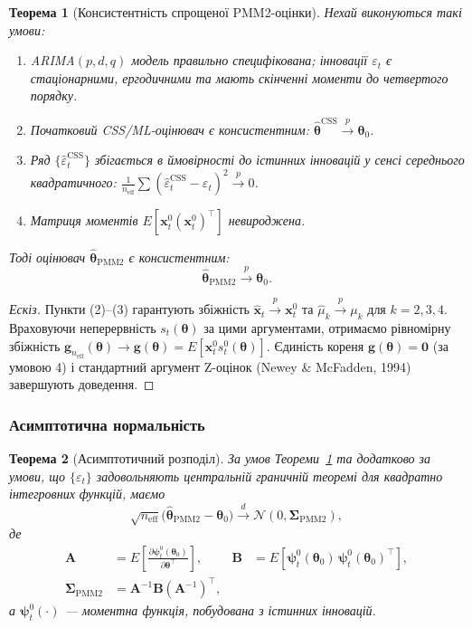 \documentclass[12pt,a4paper]{article}
\newtheorem{theorem}{Теорема}[section]
\begin{document}
\begin{theorem}[Консистентність спрощеної PMM2-оцінки]
\label{thm:pmm2_consistency}
Нехай виконуються такі умови:
\begin{enumerate}
    \item ARIMA$(p,d,q)$ модель правильно специфікована; інновації $\varepsilon_t$ є стаціонарними, ергодичними та мають скінченні моменти до четвертого порядку.
    \item Початковий CSS/ML-оцінювач є консистентним: $\hat{\boldsymbol{\theta}}^{\text{CSS}} \xrightarrow{p} \boldsymbol{\theta}_0$.
    \item Ряд $\{\widehat{\varepsilon}_t^{\text{CSS}}\}$ збігається в ймовірності до істинних інновацій у сенсі середнього квадратичного: $\frac{1}{n_\text{eff}}\sum (\widehat{\varepsilon}_t^{\text{CSS}} - \varepsilon_t)^2 \xrightarrow{p} 0$.
    \item Матриця моментів $E[\mathbf{x}_t^0 (\mathbf{x}_t^0)^\top]$ невироджена.
\end{enumerate}
Тоді оцінювач $\hat{\boldsymbol{\theta}}_{\text{PMM2}}$ є консистентним:
\[
\hat{\boldsymbol{\theta}}_{\text{PMM2}} \xrightarrow{p} \boldsymbol{\theta}_0.
\]
\end{theorem}

\begin{proof}[Ескіз]
Пункти (2)--(3) гарантують збіжність $\widehat{\mathbf{x}}_t \xrightarrow{p} \mathbf{x}_t^0$ та $\hat{\mu}_k \xrightarrow{p} \mu_k$ для $k=2,3,4$. Враховуючи неперервність $s_t(\boldsymbol{\theta})$ за цими аргументами, отримаємо рівномірну збіжність $\mathbf{g}_{n_\text{eff}}(\boldsymbol{\theta}) \to \mathbf{g}(\boldsymbol{\theta}) = E[\mathbf{x}_t^0 s_t^0(\boldsymbol{\theta})]$. Єдиність кореня $\mathbf{g}(\boldsymbol{\theta})=\mathbf{0}$ (за умовою 4) і стандартний аргумент Z-оцінок (Newey \& McFadden, 1994) завершують доведення.
\end{proof}

\subsubsection{Асимптотична нормальність}

\begin{theorem}[Асимптотичний розподіл]
\label{thm:asymptotic_normality}
За умов Теореми~\ref{thm:pmm2_consistency} та додатково за умови, що $\{\varepsilon_t\}$ задовольняють центральній граничній теоремі для квадратно інтегровних функцій, маємо
\[
\sqrt{n_\text{eff}}\big(\hat{\boldsymbol{\theta}}_{\text{PMM2}} - \boldsymbol{\theta}_0\big) \xrightarrow{d} \mathcal{N}(0,\boldsymbol{\Sigma}_{\text{PMM2}}),
\]
де
\begin{align}
\mathbf{A} &= E\!\left[ \frac{\partial \boldsymbol{\psi}_t^0(\boldsymbol{\theta}_0)}{\partial \boldsymbol{\theta}^\top} \right],
&
\mathbf{B} &= E\!\left[ \boldsymbol{\psi}_t^0(\boldsymbol{\theta}_0)\, \boldsymbol{\psi}_t^0(\boldsymbol{\theta}_0)^\top \right],\\
\boldsymbol{\Sigma}_{\text{PMM2}} &= \mathbf{A}^{-1}\mathbf{B}(\mathbf{A}^{-1})^\top,
\end{align}
а $\boldsymbol{\psi}_t^0(\cdot)$ --- моментна функція, побудована з істинних інновацій.
\end{theorem}
\end{document}
